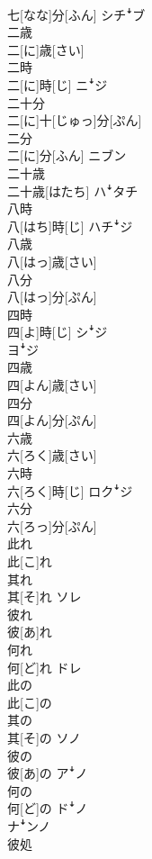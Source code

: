 \documentclass[8pt]{extreport}
\begin{document}
\begin{CJK}{UTF8}{min}
\\	七[なな]分[ふん]	シチꜜブ
\\	二歳	
\\	二[に]歳[さい]	
\\	二時	
\\	二[に]時[じ]	ニꜜジ
\\	二十分	
\\	二[に]十[じゅっ]分[ぷん]	
\\	二分	
\\	二[に]分[ふん]	ニブン
\\	二十歳	
\\	二十歳[はたち]	ハꜜタチ
\\	八時	
\\	八[はち]時[じ]	ハチꜜジ
\\	八歳	
\\	八[はっ]歳[さい]	
\\	八分	
\\	八[はっ]分[ぷん]	
\\	四時	
\\	四[よ]時[じ]	シꜜジ 
\\	ヨꜜジ
\\	四歳	
\\	四[よん]歳[さい]	
\\	四分	
\\	四[よん]分[ぷん]	
\\	六歳	
\\	六[ろく]歳[さい]	
\\	六時	
\\	六[ろく]時[じ]	ロクꜜジ
\\	六分	
\\	六[ろっ]分[ぷん]	
\\	此れ	
\\	此[こ]れ	
\\	其れ	
\\	其[そ]れ	ソレ
\\	彼れ	
\\	彼[あ]れ	
\\	何れ	
\\	何[ど]れ	ドレ
\\	此の	
\\	此[こ]の	
\\	其の	
\\	其[そ]の	ソノ
\\	彼の	
\\	彼[あ]の	アꜜノ
\\	何の	
\\	何[ど]の	ドꜜノ 
\\	ナꜜンノ
\\	彼処	

\end{CJK}
\end{document}

